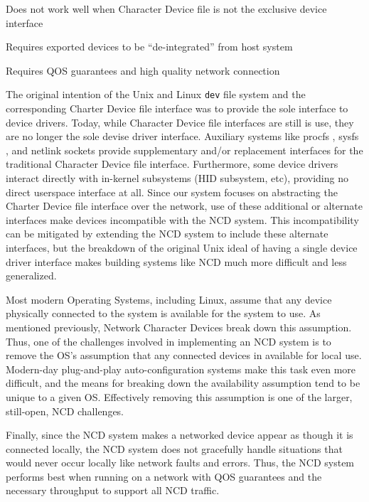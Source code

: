 \documentclass[11pt,twocolumn]{article}
\newenvironment{packed_item}{
\begin{itemize}
  \setlength{\itemsep}{1pt}
  \setlength{\parskip}{0pt}
  \setlength{\parsep}{0pt}
}{\end{itemize}}
\begin{document}
\begin{packed_item}
\item Does not work well when Character Device file is not the exclusive
  device interface
\item Requires exported devices to be ``de-integrated'' from host system
\item Requires QOS guarantees and high quality network connection
\end{packed_item}

The original intention of the Unix and Linux \texttt{dev} file
system and the corresponding Charter Device file interface was to
provide the sole interface to device drivers. Today, while Character
Device file interfaces are still is use, they are no longer the sole
devise driver interface. Auxiliary systems like procfs
\cite{interfaces}, sysfs \cite{sysfs-mochel}, and netlink sockets
\cite{netlink-ayuso} provide supplementary and/or replacement interfaces
for the traditional Character Device file interface. Furthermore, some
device drivers interact directly with in-kernel subsystems (HID subsystem,
etc), providing no direct userspace interface at all. Since our system
focuses on abstracting the Charter Device file interface over the
network, use of these additional or alternate interfaces make devices
incompatible with the NCD system. This incompatibility can be mitigated
by extending the NCD system to include these alternate interfaces, but the
breakdown of the original Unix ideal of having a single device driver
interface makes building systems like NCD much more difficult and less
generalized.

Most modern Operating Systems, including Linux, assume that any device
physically connected to the system is available for the system to
use. As mentioned previously, Network Character Devices break down this
assumption. Thus, one of the challenges involved in implementing an NCD
system is to remove the OS's assumption that any connected devices in
available for local use. Modern-day plug-and-play auto-configuration
systems make this task even more difficult, and the means for breaking
down the availability assumption tend to be unique to a given
OS. Effectively removing this assumption is one of the larger,
still-open, NCD challenges.

Finally, since the NCD system makes a networked device appear as
though it is connected locally, the NCD system does not gracefully
handle situations that would never occur locally like network faults
and errors. Thus, the NCD system performs best when running on a
network with QOS guarantees and the necessary throughput to support all
NCD traffic.
\end{document}
